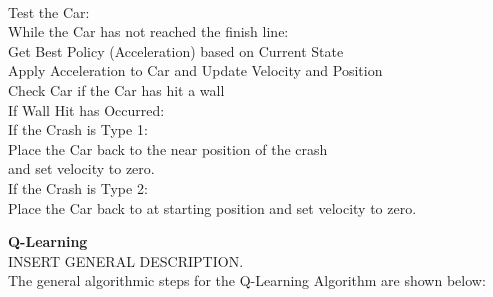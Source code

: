\documentclass[twoside,11pt]{article}
\newcommand\tab[1][1cm]{\hspace*{#1}}
\begin{document}
\\
Test the Car:\\
\tab While the Car has not reached the finish line:\\
\tab \tab Get Best Policy (Acceleration) based on Current State\\
\tab \tab Apply Acceleration to Car and Update Velocity and Position\\
\tab \tab Check Car if the Car has hit a wall\\
\tab \tab If Wall Hit has Occurred:\\
\tab \tab \tab If the Crash is Type 1:\\
\tab \tab \tab \tab Place the Car back to the near position of the crash\\ 
\tab \tab \tab \tab and set velocity to zero.\\
\tab \tab \tab If the Crash is Type 2:\\
\tab \tab \tab \tab Place the Car back to at starting position and set velocity to zero.\\
\newpage

\textbf{Q-Learning}\\
INSERT GENERAL DESCRIPTION.\\
The general algorithmic steps for the Q-Learning Algorithm are shown below:\\
\end{document}
